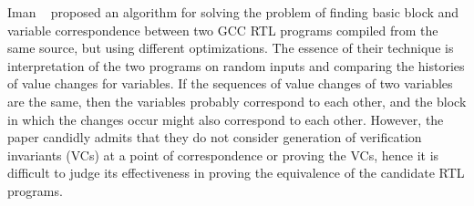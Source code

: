 Iman \etal~\cite{Iman2005} proposed an algorithm for solving the problem of
finding basic block and variable correspondence between two GCC RTL programs
compiled from the same source, but using different optimizations.  The essence
of their technique is interpretation of the two programs on random inputs and
comparing the histories of value changes for variables.  If the sequences of
value changes of two variables are the same, then the variables probably
correspond to each other, and the block in which the changes occur might also
correspond to each other. However, the paper candidly admits that they do not consider  generation of
verification invariants (VCs) at a point of correspondence or proving the VCs, hence it is difficult
to judge  its effectiveness in proving the equivalence of the candidate RTL
programs.     




